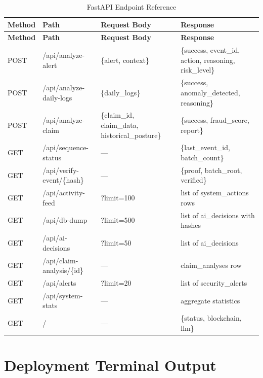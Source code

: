 \documentclass[12pt,a4paper]{article}
\begin{document}
\begin{longtable}{@{}p{1cm}p{4cm}p{4cm}p{4cm}@{}}
\caption{FastAPI Endpoint Reference}
\label{tab:endpoints}\\
\toprule
\rowcolor{gray!15}
\textbf{Method} & \textbf{Path} & \textbf{Request Body} & \textbf{Response} \\
\midrule
\endfirsthead
\toprule
\rowcolor{gray!15}
\textbf{Method} & \textbf{Path} & \textbf{Request Body} & \textbf{Response} \\
\midrule
\endhead
POST & /api/analyze-alert & \{alert, context\} & \{success, event\_id, action, reasoning, risk\_level\} \\
POST & /api/analyze-daily-logs & \{daily\_logs\} & \{success, anomaly\_detected, reasoning\} \\
POST & /api/analyze-claim & \{claim\_id, claim\_data, historical\_posture\} & \{success, fraud\_score, report\} \\
GET & /api/sequence-status & --- & \{last\_event\_id, batch\_count\} \\
GET & /api/verify-event/\{hash\} & --- & \{proof, batch\_root, verified\} \\
GET & /api/activity-feed & ?limit=100 & list of system\_actions rows \\
GET & /api/db-dump & ?limit=500 & list of ai\_decisions with hashes \\
GET & /api/ai-decisions & ?limit=50 & list of ai\_decisions \\
GET & /api/claim-analysis/\{id\} & --- & claim\_analyses row \\
GET & /api/alerts & ?limit=20 & list of security\_alerts \\
GET & /api/system-stats & --- & aggregate statistics \\
GET & / & --- & \{status, blockchain, llm\} \\
\bottomrule
\end{longtable}

\section{Deployment Terminal Output}
\label{app:deploy}
\end{document}
